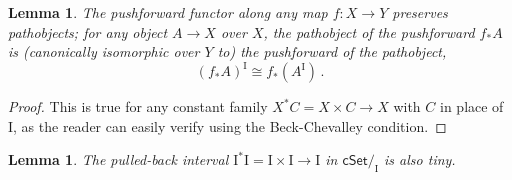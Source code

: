 \documentclass[11pt,reqno]{amsart}
\newcommand{\cSet}{\ensuremath{\mathsf{cSet}}}
\newcommand{\slice}[1]{\ensuremath{/_{\!{#1}}}}
\renewcommand{\to}{\ensuremath{\rightarrow}}
\newcommand{\I}{\ensuremath{\mathrm{I}}}
\newtheorem{lemma}[theorem]{Lemma}
\theoremstyle{remark}
\theoremstyle{definition}
\begin{document}
\begin{lemma}\label{lemma:pathspacepushforward}
The pushforward functor along any map $f : X\to Y$ preserves pathobjects; for any object $A \to X$ over $X$, the pathobject of the pushforward $f_*A$ is (canonically isomorphic over $Y$ to) the pushforward of the pathobject,
\[
(f_*A)^\I \cong f_*(A^\I)\,.
\]
\end{lemma}
\begin{proof}
This is true for any constant family $X^*C = X\times C \to X$ with $C$ in place of $\I$, as the reader can easily verify using the Beck-Chevalley condition.
\end{proof}  


\begin{lemma}\label{lemma:tinyslicedI}
The pulled-back interval $\I^*\I = \I\times\I\to \I$ in $\cSet\slice{\I}$ is also tiny.
\end{lemma}
\end{document}
